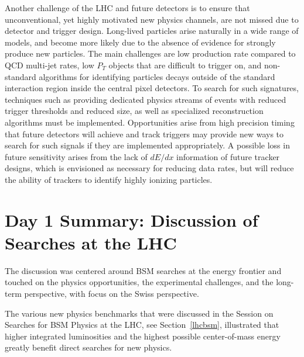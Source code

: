Another challenge of the LHC and future detectors is to ensure that unconventional, yet highly motivated new physics channels, are not missed due to detector and trigger design.  Long-lived particles arise naturally in a wide range of models, and become more likely due to the absence of evidence for strongly produce new particles. The main challenges are low production rate compared to QCD multi-jet rates, low $P_T$ objects that are difficult to trigger on, and non-standard algorithms for identifying particles decays outside of the standard interaction region inside the central pixel detectors.  To search for such signatures, techniques such as providing dedicated physics streams of events with reduced trigger thresholds and reduced size, as well as specialized reconstruction algorithms must be implemented.  Opportunities arise from high precision timing that future detectors will achieve and track triggers may provide new ways to search for such signals if they are implemented appropriately.  A possible loss in future sensitivity arises from the lack of $dE/dx$ information of future tracker designs, which is envisioned as necessary for reducing data rates, but will reduce the ability of trackers to identify highly ionizing particles. 





\section{Day 1 Summary: Discussion of Searches at the LHC}\label{section:discussionsearches}

The discussion was centered around BSM searches at the energy frontier and touched on the physics opportunities, the experimental challenges, and the long-term perspective, with focus on the Swiss perspective.

The various new physics benchmarks that were discussed in the Session on Searches for BSM Physics at the LHC, see Section~\ref{lhcbsm}, illustrated that higher integrated luminosities and the highest possible center-of-mass energy greatly benefit direct searches for new physics.

